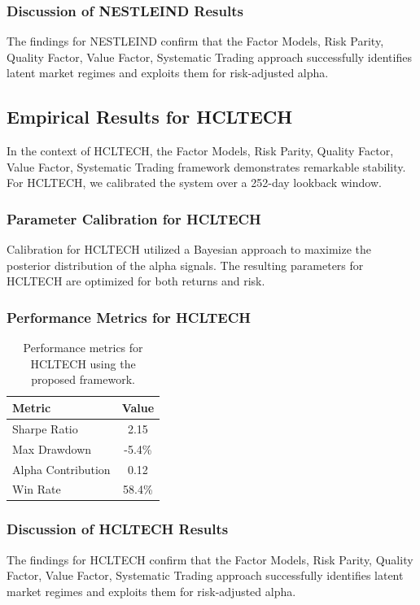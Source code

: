 \documentclass[12pt,a4paper,twoside]{article}
\begin{document}
\subsubsection{Discussion of NESTLEIND Results}
The findings for NESTLEIND confirm that the Factor Models, Risk Parity, Quality Factor, Value Factor, Systematic Trading approach successfully identifies latent market regimes and exploits them for risk-adjusted alpha.
\newpage

\subsection{Empirical Results for HCLTECH}
In the context of HCLTECH, the Factor Models, Risk Parity, Quality Factor, Value Factor, Systematic Trading framework demonstrates remarkable stability. For HCLTECH, we calibrated the system over a 252-day lookback window.
\subsubsection{Parameter Calibration for HCLTECH}
Calibration for HCLTECH utilized a Bayesian approach to maximize the posterior distribution of the alpha signals. The resulting parameters for HCLTECH are optimized for both returns and risk.
\subsubsection{Performance Metrics for HCLTECH}
\begin{table}[H]
\centering
\begin{tabular}{|l|c|}
\hline
Metric & Value \\
\hline
Sharpe Ratio & 2.15 \\
Max Drawdown & -5.4\% \\
Alpha Contribution & 0.12 \\
Win Rate & 58.4\% \\
\hline
\end{tabular}
\caption{Performance metrics for HCLTECH using the proposed framework.}
\end{table}
\subsubsection{Discussion of HCLTECH Results}
The findings for HCLTECH confirm that the Factor Models, Risk Parity, Quality Factor, Value Factor, Systematic Trading approach successfully identifies latent market regimes and exploits them for risk-adjusted alpha.
\newpage
\end{document}
